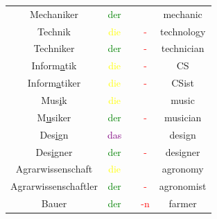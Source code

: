 \begin{center}
\begin{longtable} {|c|c|c|c|c|}
        Mechaniker                      & \textcolor{green}{der}                         &                       &                                          & mechanic                \\
        Technik                         & \textcolor{yellow}{die}                        &                       & \textcolor{red}{-}                       & technology              \\
        Techniker                       & \textcolor{green}{der}                         &                       & \textcolor{red}{-}                       & technician              \\
        \hline
        Inform\underline{a}tik          & \textcolor{yellow}{die}                        &                       & \textcolor{red}{-}                       & CS                      \\
        Inform\underline{a}tiker        & \textcolor{yellow}{die}                        &                       & \textcolor{red}{-}                       & CSist                   \\
        \hline
        Mus\underline{i}k               & \textcolor{yellow}{die}                        &                       &                                          & music                   \\
        M\underline{u}siker             & \textcolor{green}{der}                         &                       & \textcolor{red}{-}                       & musician                \\
        \hline
        Des\underline{i}gn              & \textcolor{purple}{das}                        &                       &                                          & design                  \\
        Des\underline{i}gner            & \textcolor{green}{der}                         &                       & \textcolor{red}{-}                       & designer                \\
        \hline
        Agrarwissenschaft               & \textcolor{yellow}{die}                        &                       &                                          & agronomy                \\
        Agrarwissenschaftler            & \textcolor{green}{der}                         &                       & \textcolor{red}{-}                       & agronomist              \\
        Bauer                           & \textcolor{green}{der}                         &                       & \textcolor{red}{-n}                      & farmer                  \\

\end{longtable}
\end{center}
